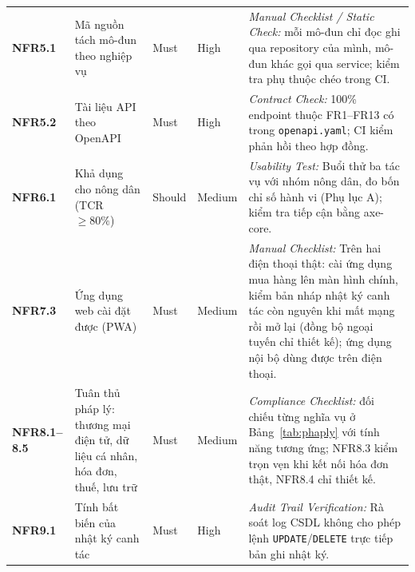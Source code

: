 \begin{longtable}{L{1.52cm} L{4.20cm} >{\centering\arraybackslash}p{1.65cm} >{\centering\arraybackslash}p{2.00cm} L{4.82cm}}
\textbf{NFR5.1} & Mã nguồn tách mô-đun theo nghiệp vụ & Must & High & \textit{Manual Checklist / Static Check:} mỗi mô-đun chỉ đọc ghi qua repository của mình, mô-đun khác gọi qua service; kiểm tra phụ thuộc chéo trong CI. \\
\textbf{NFR5.2} & Tài liệu API theo OpenAPI & Must & High & \textit{Contract Check:} 100\% endpoint thuộc FR1--FR13 có trong \texttt{openapi.yaml}; CI kiểm phản hồi theo hợp đồng. \\
\textbf{NFR6.1} & Khả dụng cho nông dân (TCR $\ge 80\%$) & Should & Medium & \textit{Usability Test:} Buổi thử ba tác vụ với nhóm nông dân, đo bốn chỉ số hành vi (Phụ lục A); kiểm tra tiếp cận bằng axe-core. \\
\textbf{NFR7.3} & Ứng dụng web cài đặt được (PWA) & Must & Medium & \textit{Manual Checklist:} Trên hai điện thoại thật: cài ứng dụng mua hàng lên màn hình chính, kiểm bản nháp nhật ký canh tác còn nguyên khi mất mạng rồi mở lại (đồng bộ ngoại tuyến chỉ thiết kế); ứng dụng nội bộ dùng được trên điện thoại. \\
\textbf{NFR8.1--8.5} & Tuân thủ pháp lý: thương mại điện tử, dữ liệu cá nhân, hóa đơn, thuế, lưu trữ & Must & Medium & \textit{Compliance Checklist:} đối chiếu từng nghĩa vụ ở Bảng~\ref{tab:phaply} với tính năng tương ứng; NFR8.3 kiểm trọn vẹn khi kết nối hóa đơn thật, NFR8.4 chỉ thiết kế. \\
\textbf{NFR9.1} & Tính bất biến của nhật ký canh tác & Must & High & \textit{Audit Trail Verification:} Rà soát log CSDL không cho phép lệnh \texttt{UPDATE}/\texttt{DELETE} trực tiếp bản ghi nhật ký. \\
\end{longtable}
\endgroup
